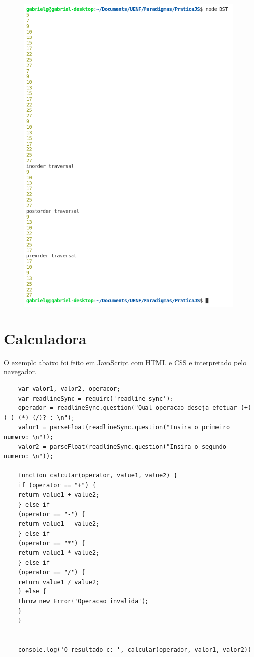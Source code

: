     \begin{figure}[H]
    	\centering
    	\includegraphics[width=0.9\linewidth]{Pictures/BST_Result}
    	\caption{}
    	\label{fig:bstresult}
    \end{figure}
    


    \section{Calculadora}
    O exemplo abaixo foi feito em JavaScript com HTML e CSS e interpretado pelo navegador.
    \begin{lstlisting}
    var valor1, valor2, operador;
    var readlineSync = require('readline-sync');
    operador = readlineSync.question("Qual operacao deseja efetuar (+) (-) (*) (/)? : \n");
    valor1 = parseFloat(readlineSync.question("Insira o primeiro numero: \n"));
    valor2 = parseFloat(readlineSync.question("Insira o segundo numero: \n"));
    
    function calcular(operator, value1, value2) {
    if (operator == "+") {
    return value1 + value2;
    } else if
    (operator == "-") {
    return value1 - value2;
    } else if
    (operator == "*") {
    return value1 * value2;
    } else if
    (operator == "/") {
    return value1 / value2;
    } else {
    throw new Error('Operacao invalida');
    }
    }
    
    
    console.log('O resultado e: ', calcular(operador, valor1, valor2))     
    \end{lstlisting}
    

